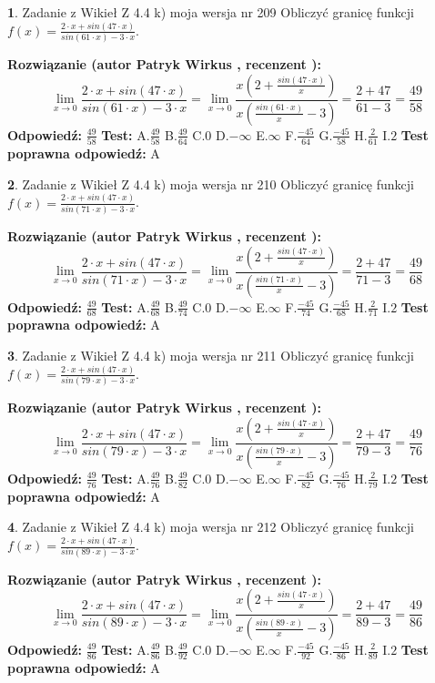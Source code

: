 \documentclass[12pt, a4paper]{article}
\theoremstyle{definition} %
\newtheorem{zad}{}
\newcommand{\zadStart}[1]{\begin{zad}#1\newline}
\newcommand{\zadStop}{\end{zad}}
\newcommand{\rozwStart}[2]{\noindent \textbf{Rozwiązanie (autor #1 , recenzent #2): }\newline}
\newcommand{\rozwStop}{\newline}
\newcommand{\odpStart}{\noindent \textbf{Odpowiedź:}\newline}
\newcommand{\odpStop}{\newline}
\newcommand{\testStart}{\noindent \textbf{Test:}\newline}
\newcommand{\testStop}{\newline}
\newcommand{\kluczStart}{\noindent \textbf{Test poprawna odpowiedź:}\newline}
\newcommand{\kluczStop}{\newline}
\begin{document}
\zadStart{Zadanie z Wikieł Z 4.4 k) moja wersja nr 209}
Obliczyć granicę funkcji $f(x)=\frac{2\cdot x +sin(47\cdot x)}{sin(61\cdot x) -3\cdot x}$.
\zadStop
\rozwStart{Patryk Wirkus}{}
$$\lim\limits_{x\to 0}\frac{2\cdot x +sin(47\cdot x)}{sin(61\cdot x) -3\cdot x}
=\lim\limits_{x\to 0}\frac{x(2+\frac{sin(47\cdot x)}{x})}{x(\frac{sin(61\cdot x)}{x}-3)}
=\frac{2+47}{61-3} = \frac{49}{58}$$
\rozwStop
\odpStart
$\frac{49}{58}$
\odpStop
\testStart
A.$\frac{49}{58}$
B.$\frac{49}{64}$
C.$0$
D.$-\infty$
E.$\infty$
F.$\frac{-45}{64}$
G.$\frac{-45}{58}$
H.$\frac{2}{61}$
I.$2$
\testStop
\kluczStart
A
\kluczStop



\zadStart{Zadanie z Wikieł Z 4.4 k) moja wersja nr 210}
Obliczyć granicę funkcji $f(x)=\frac{2\cdot x +sin(47\cdot x)}{sin(71\cdot x) -3\cdot x}$.
\zadStop
\rozwStart{Patryk Wirkus}{}
$$\lim\limits_{x\to 0}\frac{2\cdot x +sin(47\cdot x)}{sin(71\cdot x) -3\cdot x}
=\lim\limits_{x\to 0}\frac{x(2+\frac{sin(47\cdot x)}{x})}{x(\frac{sin(71\cdot x)}{x}-3)}
=\frac{2+47}{71-3} = \frac{49}{68}$$
\rozwStop
\odpStart
$\frac{49}{68}$
\odpStop
\testStart
A.$\frac{49}{68}$
B.$\frac{49}{74}$
C.$0$
D.$-\infty$
E.$\infty$
F.$\frac{-45}{74}$
G.$\frac{-45}{68}$
H.$\frac{2}{71}$
I.$2$
\testStop
\kluczStart
A
\kluczStop



\zadStart{Zadanie z Wikieł Z 4.4 k) moja wersja nr 211}
Obliczyć granicę funkcji $f(x)=\frac{2\cdot x +sin(47\cdot x)}{sin(79\cdot x) -3\cdot x}$.
\zadStop
\rozwStart{Patryk Wirkus}{}
$$\lim\limits_{x\to 0}\frac{2\cdot x +sin(47\cdot x)}{sin(79\cdot x) -3\cdot x}
=\lim\limits_{x\to 0}\frac{x(2+\frac{sin(47\cdot x)}{x})}{x(\frac{sin(79\cdot x)}{x}-3)}
=\frac{2+47}{79-3} = \frac{49}{76}$$
\rozwStop
\odpStart
$\frac{49}{76}$
\odpStop
\testStart
A.$\frac{49}{76}$
B.$\frac{49}{82}$
C.$0$
D.$-\infty$
E.$\infty$
F.$\frac{-45}{82}$
G.$\frac{-45}{76}$
H.$\frac{2}{79}$
I.$2$
\testStop
\kluczStart
A
\kluczStop



\zadStart{Zadanie z Wikieł Z 4.4 k) moja wersja nr 212}
Obliczyć granicę funkcji $f(x)=\frac{2\cdot x +sin(47\cdot x)}{sin(89\cdot x) -3\cdot x}$.
\zadStop
\rozwStart{Patryk Wirkus}{}
$$\lim\limits_{x\to 0}\frac{2\cdot x +sin(47\cdot x)}{sin(89\cdot x) -3\cdot x}
=\lim\limits_{x\to 0}\frac{x(2+\frac{sin(47\cdot x)}{x})}{x(\frac{sin(89\cdot x)}{x}-3)}
=\frac{2+47}{89-3} = \frac{49}{86}$$
\rozwStop
\odpStart
$\frac{49}{86}$
\odpStop
\testStart
A.$\frac{49}{86}$
B.$\frac{49}{92}$
C.$0$
D.$-\infty$
E.$\infty$
F.$\frac{-45}{92}$
G.$\frac{-45}{86}$
H.$\frac{2}{89}$
I.$2$
\testStop
\kluczStart
A
\kluczStop
\end{document}
